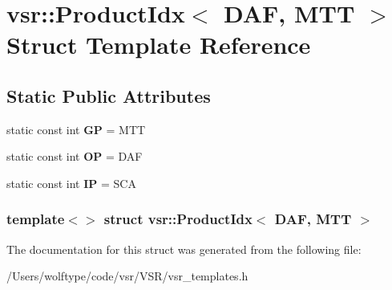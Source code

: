 \hypertarget{structvsr_1_1_product_idx_3_01_d_a_f_00_01_m_t_t_01_4}{\section{vsr\-:\-:Product\-Idx$<$ D\-A\-F, M\-T\-T $>$ Struct Template Reference}
\label{structvsr_1_1_product_idx_3_01_d_a_f_00_01_m_t_t_01_4}
}
\subsection*{Static Public Attributes}
\begin{DoxyCompactItemize}
\item 
\hypertarget{structvsr_1_1_product_idx_3_01_d_a_f_00_01_m_t_t_01_4_a7377108a85cfbe553d89c84e30658487}{static const int {\bfseries G\-P} = M\-T\-T}\label{structvsr_1_1_product_idx_3_01_d_a_f_00_01_m_t_t_01_4_a7377108a85cfbe553d89c84e30658487}

\item 
\hypertarget{structvsr_1_1_product_idx_3_01_d_a_f_00_01_m_t_t_01_4_acbb253d539d80fe282b7ab58368eddeb}{static const int {\bfseries O\-P} = D\-A\-F}\label{structvsr_1_1_product_idx_3_01_d_a_f_00_01_m_t_t_01_4_acbb253d539d80fe282b7ab58368eddeb}

\item 
\hypertarget{structvsr_1_1_product_idx_3_01_d_a_f_00_01_m_t_t_01_4_a322ac5aa74ec6aa52e043a3669df3c68}{static const int {\bfseries I\-P} = S\-C\-A}\label{structvsr_1_1_product_idx_3_01_d_a_f_00_01_m_t_t_01_4_a322ac5aa74ec6aa52e043a3669df3c68}

\end{DoxyCompactItemize}
\subsubsection*{template$<$$>$ struct vsr\-::\-Product\-Idx$<$ D\-A\-F, M\-T\-T $>$}



The documentation for this struct was generated from the following file\-:\begin{DoxyCompactItemize}
\item 
/\-Users/wolftype/code/vsr/\-V\-S\-R/vsr\-\_\-templates.\-h\end{DoxyCompactItemize}
